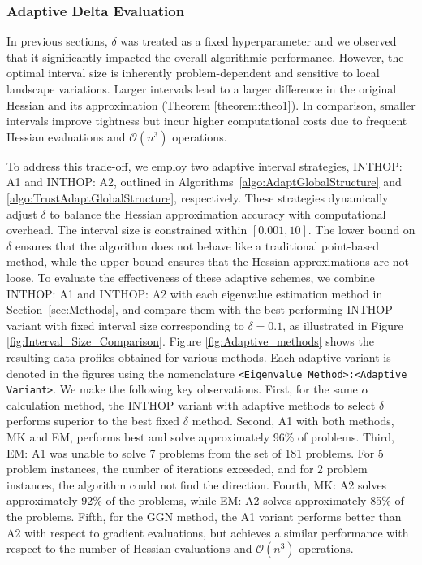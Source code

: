 \documentclass{elsarticle}
\numberwithin{equation}{section}
\begin{document}
\subsubsection{Adaptive Delta Evaluation}
In previous sections, $\delta$ was treated as a fixed hyperparameter and we observed that it significantly impacted the overall algorithmic performance. However, the optimal interval size is inherently problem-dependent and sensitive to local landscape variations. Larger intervals lead to a larger difference in the original Hessian and its approximation (Theorem \ref{theorem:theo1}). In comparison, smaller intervals improve tightness but incur higher computational costs due to frequent Hessian evaluations and $\mathcal{O}(n^3)$ operations.

To address this trade-off, we employ two adaptive interval strategies, INTHOP: A1 and INTHOP: A2, outlined in Algorithms~\ref{algo:AdaptGlobalStructure} and \ref{algo:TrustAdaptGlobalStructure}, respectively. These strategies dynamically adjust \(\delta\) to balance the Hessian approximation accuracy with computational overhead. The interval size is constrained within \([0.001, 10]\). The lower bound on $\delta$ ensures that the algorithm does not behave like a traditional point-based method, while the upper bound ensures that the Hessian approximations are not loose. To evaluate the effectiveness of these adaptive schemes, we combine INTHOP: A1 and INTHOP: A2 with each eigenvalue estimation method in Section~\ref{sec:Methods}, and compare them with the best performing INTHOP variant with fixed interval size corresponding to $\delta=0.1$, as illustrated in Figure \ref{fig:Interval_Size_Comparison}. Figure \ref{fig:Adaptive_methods} shows the resulting data profiles obtained for various methods. Each adaptive variant is denoted in the figures using the nomenclature \texttt{<Eigenvalue Method>:<Adaptive Variant>}. We make the following key observations. {First, for the same $\alpha$ calculation method, the INTHOP variant with adaptive methods to select $\delta$ performs superior to the best fixed $\delta$ method. Second, A1 with both methods, MK and EM, performs best and solve approximately 96\% of problems}. {{Third, EM: A1 was unable to solve 7 problems from the set of 181 problems. For 5 problem instances, the number of iterations exceeded, and for 2 problem instances, the algorithm could not find the direction.}} {Fourth, MK: A2 solves approximately 92\% of the problems, while EM: A2 solves  approximately 85\% of the problems. Fifth, for the GGN method, the A1 variant performs better than A2 with respect to gradient evaluations, but achieves a similar performance with respect to the number of Hessian evaluations and $\mathcal{O}(n^3)$ operations.} 
\end{document}
